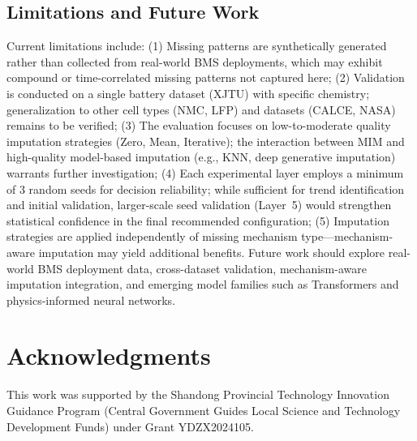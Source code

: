 \documentclass[5p,times]{elsarticle}
\begin{document}
\subsection{Limitations and Future Work}\label{sec:future}

Current limitations include: (1) Missing patterns are synthetically generated rather than collected from real-world BMS deployments, which may exhibit compound or time-correlated missing patterns not captured here; (2) Validation is conducted on a single battery dataset (XJTU) with specific chemistry; generalization to other cell types (NMC, LFP) and datasets (CALCE, NASA) remains to be verified; (3) The evaluation focuses on low-to-moderate quality imputation strategies (Zero, Mean, Iterative); the interaction between MIM and high-quality model-based imputation (e.g., KNN, deep generative imputation) warrants further investigation; (4) Each experimental layer employs a minimum of 3 random seeds for decision reliability; while sufficient for trend identification and initial validation, larger-scale seed validation (Layer~5) would strengthen statistical confidence in the final recommended configuration; (5) Imputation strategies are applied independently of missing mechanism type---mechanism-aware imputation may yield additional benefits. Future work should explore real-world BMS deployment data, cross-dataset validation, mechanism-aware imputation integration, and emerging model families such as Transformers and physics-informed neural networks.

\section*{Acknowledgments}

This work was supported by the Shandong Provincial Technology Innovation Guidance Program (Central Government Guides Local Science and Technology Development Funds) under Grant YDZX2024105.




\end{document}
